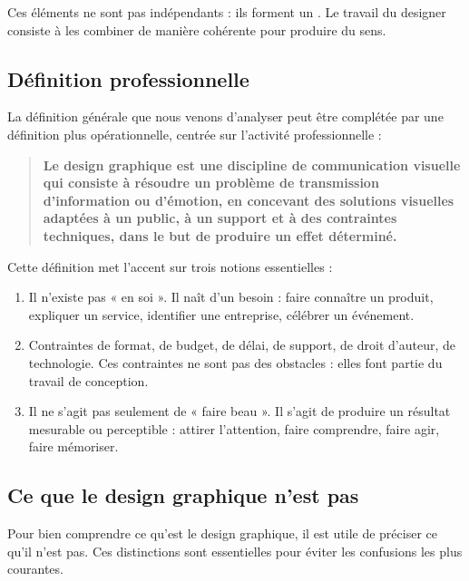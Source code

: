 Ces éléments ne sont pas indépendants : ils forment un . Le travail du designer consiste à les combiner de manière cohérente pour produire du sens.

\subsection{Définition professionnelle}

La définition générale que nous venons d'analyser peut être complétée par une définition plus opérationnelle, centrée sur l'activité professionnelle :

\begin{quote}
\textbf{Le design graphique est une discipline de communication visuelle qui consiste à résoudre un problème de transmission d'information ou d'émotion, en concevant des solutions visuelles adaptées à un public, à un support et à des contraintes techniques, dans le but de produire un effet déterminé.}
\end{quote}

Cette définition met l'accent sur trois notions essentielles :

\begin{enumerate}
    \item {} Il n'existe pas « en soi ». Il naît d'un besoin : faire connaître un produit, expliquer un service, identifier une entreprise, célébrer un événement.
    \item {} Contraintes de format, de budget, de délai, de support, de droit d'auteur, de technologie. Ces contraintes ne sont pas des obstacles : elles font partie du travail de conception.
    \item {} Il ne s'agit pas seulement de « faire beau ». Il s'agit de produire un résultat mesurable ou perceptible : attirer l'attention, faire comprendre, faire agir, faire mémoriser.
\end{enumerate}

\subsection{Ce que le design graphique n'est pas}

Pour bien comprendre ce qu'est le design graphique, il est utile de préciser ce qu'il n'est pas. Ces distinctions sont essentielles pour éviter les confusions les plus courantes.

